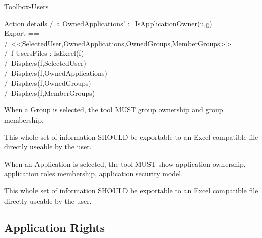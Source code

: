 \documentclass{scrreprt}
\begin{document}
\begin{module}{Toolbox-Users}
\begin{decls}{Action details}
      \> /\ \forall  a \in OwnedApplications' :  ~IsApplicationOwner(u,g)\\
      Export ==\\
      \> /\ \UNCHANGED <<SelectedUser,OwnedApplications,OwnedGroups,MemberGroups>>\\
      \> /\ \exists f \in UsersFiles : IsExcel(f)\\
      \> /\ Displays(f,SelectedUser)\\
      \> /\ Displays(f,OwnedApplications)\\
      \> /\ Displays(f,OwnedGroups)\\
      \> /\ Displays(f,MemberGroups)\\
    \end{decls}
    
  \end{module}
  \notla



\begin{reqmt}
When a Group is selected, the tool MUST group ownership and group
membership.

This whole set of information SHOULD be exportable to an Excel
compatible file directly useable by the user. 

\end{reqmt}
\begin{reqmt}
When an Application is selected, the tool MUST show application
ownership,  application roles membership,
application security model.

This whole set of information SHOULD be exportable to an Excel
compatible file directly useable by the user. 

\end{reqmt}

\subsection{Application Rights}
\label{sec:application-rights}
\end{document}
